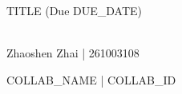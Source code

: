 \documentclass{article}
\theoremstyle{definition}\newmdtheoremenv[style = light]{exercise}{Exercise}[subsection]
\theoremstyle{definition}\newmdtheoremenv[style = light]{exerciseUnnumbered}{Exercise\!\!}
\begin{document}
    \begin{center}
        \large{TITLE (Due DUE_DATE)}\\\ \\
        \begin{minipage}{0.3\textwidth}
            \begin{center}
                \normalsize{Zhaoshen Zhai | 261003108}
            \end{center}
        \end{minipage}
        \begin{minipage}{0.3\textwidth}
            \begin{center}
                \normalsize{COLLAB_NAME | COLLAB_ID}
            \end{center}
        \end{minipage}
    \end{center}

    \setcounter{section}{0}
    \setcounter{subsection}{0}
    \setcounter{exercise}{0}

    \begin{exercise}
        
    \end{exercise}
    \begin{solution}
        
    \end{solution}
\end{document}
